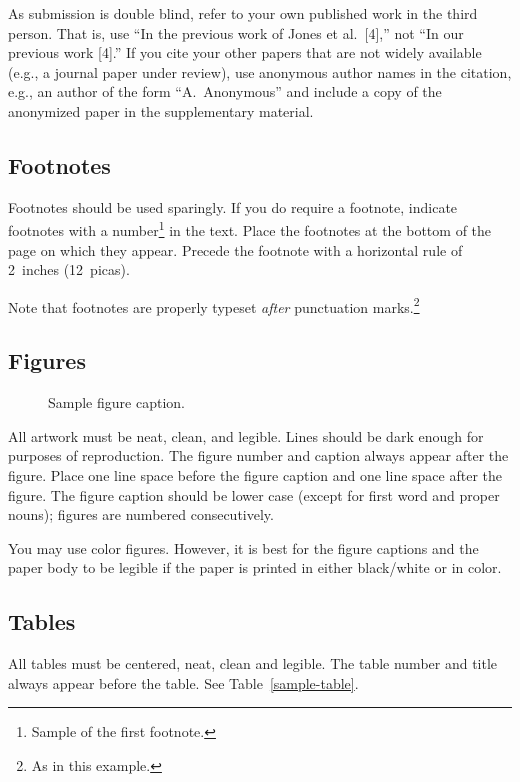\documentclass{article}
\begin{document}
As submission is double blind, refer to your own published work in the third
person. That is, use ``In the previous work of Jones et al.\ [4],'' not ``In our
previous work [4].'' If you cite your other papers that are not widely available
(e.g., a journal paper under review), use anonymous author names in the
citation, e.g., an author of the form ``A.\ Anonymous'' and include a copy of the anonymized paper in the supplementary material.


\subsection{Footnotes}


Footnotes should be used sparingly.  If you do require a footnote, indicate
footnotes with a number\footnote{Sample of the first footnote.} in the
text. Place the footnotes at the bottom of the page on which they appear.
Precede the footnote with a horizontal rule of 2~inches (12~picas).


Note that footnotes are properly typeset \emph{after} punctuation
marks.\footnote{As in this example.}


\subsection{Figures}


\begin{figure}
    \centering
    \fbox{\rule[-.5cm]{0cm}{4cm} \rule[-.5cm]{4cm}{0cm}}
    \caption{Sample figure caption.}
\end{figure}


All artwork must be neat, clean, and legible. Lines should be dark enough for
purposes of reproduction. The figure number and caption always appear after the
figure. Place one line space before the figure caption and one line space after
the figure. The figure caption should be lower case (except for first word and
proper nouns); figures are numbered consecutively.


You may use color figures.  However, it is best for the figure captions and the
paper body to be legible if the paper is printed in either black/white or in
color.


\subsection{Tables}


All tables must be centered, neat, clean and legible.  The table number and
title always appear before the table.  See Table~\ref{sample-table}.
\end{document}
